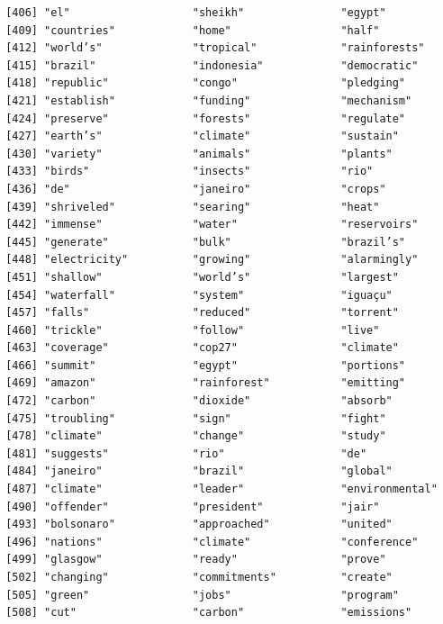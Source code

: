 \documentclass[
  letterpaper,
  DIV=11,
  numbers=noendperiod]{scrartcl}
\begin{document}
\begin{verbatim}
 [406] "el"                   "sheikh"               "egypt"               
 [409] "countries"            "home"                 "half"                
 [412] "world’s"              "tropical"             "rainforests"         
 [415] "brazil"               "indonesia"            "democratic"          
 [418] "republic"             "congo"                "pledging"            
 [421] "establish"            "funding"              "mechanism"           
 [424] "preserve"             "forests"              "regulate"            
 [427] "earth’s"              "climate"              "sustain"             
 [430] "variety"              "animals"              "plants"              
 [433] "birds"                "insects"              "rio"                 
 [436] "de"                   "janeiro"              "crops"               
 [439] "shriveled"            "searing"              "heat"                
 [442] "immense"              "water"                "reservoirs"          
 [445] "generate"             "bulk"                 "brazil’s"            
 [448] "electricity"          "growing"              "alarmingly"          
 [451] "shallow"              "world’s"              "largest"             
 [454] "waterfall"            "system"               "iguaçu"              
 [457] "falls"                "reduced"              "torrent"             
 [460] "trickle"              "follow"               "live"                
 [463] "coverage"             "cop27"                "climate"             
 [466] "summit"               "egypt"                "portions"            
 [469] "amazon"               "rainforest"           "emitting"            
 [472] "carbon"               "dioxide"              "absorb"              
 [475] "troubling"            "sign"                 "fight"               
 [478] "climate"              "change"               "study"               
 [481] "suggests"             "rio"                  "de"                  
 [484] "janeiro"              "brazil"               "global"              
 [487] "climate"              "leader"               "environmental"       
 [490] "offender"             "president"            "jair"                
 [493] "bolsonaro"            "approached"           "united"              
 [496] "nations"              "climate"              "conference"          
 [499] "glasgow"              "ready"                "prove"               
 [502] "changing"             "commitments"          "create"              
 [505] "green"                "jobs"                 "program"             
 [508] "cut"                  "carbon"               "emissions"           

\end{verbatim}
\end{document}
